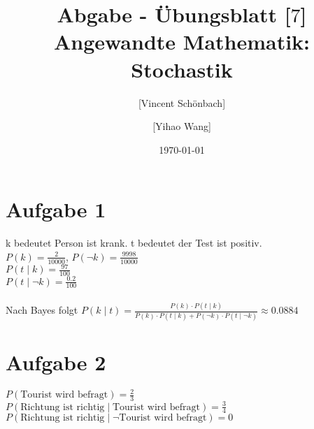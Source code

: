 \documentclass[10pt,a4paper]{article}
\begin{document}
\title{Abgabe - Übungsblatt [$7$]\\
\small{Angewandte Mathematik: Stochastik}}
\author{ [Vincent Schönbach] \and [Yihao Wang]}
\date{\today}
\maketitle

\section*{Aufgabe 1}
k bedeutet Person ist krank. t bedeutet der Test ist positiv.\\
$P(k) = \frac{2}{10000}$,  $P(\lnot k) = \frac{9998}{10000}$\\
$P(t \mid k) = \frac{97}{100}$\\
$P(t \mid \lnot k) = \frac{0.2}{100}$\\
\\
Nach Bayes folgt 
$P(k \mid t) = \frac{P(k) \cdot P(t \mid k)}{P(k) \cdot P(t \mid k) + P(\lnot k) \cdot P(t \mid \lnot k)}\approx 0.0884$

\newpage

 \section*{Aufgabe 2}
$P(\text{Tourist wird befragt})=\frac{2}{3}$\\
$P(\text{Richtung ist richtig} \mid \text{Tourist wird befragt}) = \frac{3}{4}$\\
$P(\text{Richtung ist richtig} \mid \lnot \text{Tourist wird befragt}) = 0$\\
\end{document}
